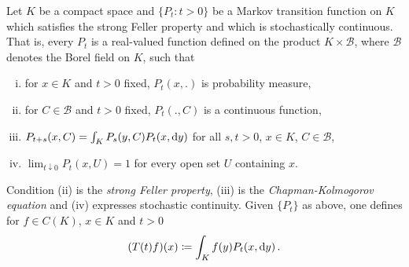 \begin{example}\label{ex:b4-2.6}
	Let $K$ be a compact space and $\{P_t \colon t > 0\}$ be a
	Markov transition function on $K$ which satisfies the strong Feller
	property and which is stochastically continuous.
	That is, every
	$P_t$ is a real-valued function defined on the product $K \times \mathcal{B}$, where $\mathcal{B}$
	denotes the Borel field on $K$, such that
	\begin{enumerate}[(i)]
		\item 
		for $x \in K$ and $t > 0$ fixed, $P_t(x,.)$ is probability measure,
	
		\item 
		for $C \in \mathcal{B}$ and $t > 0$ fixed, $P_t(.,C)$ is a continuous function,
	
		\item 
		$P_{t+s}(x,C) = \int_K P_s(y,C)P_t(x,\mathop{}\!\mathrm{d}{y})$ for all $s,t > 0$, $x \in K$, $C \in \mathcal{B}$,
	
		\item 
		$\lim_{t\downarrow0} P_t(x,U) = 1$ for every open set $U$ containing $x$.
	\end{enumerate}
	Condition (ii) is the \emph{strong Feller property}, (iii) is the \emph{Chapman-Kolmogorov equation} and (iv) expresses stochastic continuity.
	Given $\{P_t\}$ as above, one defines for $f \in C(K)$, $x \in K$ and $t > 0$
	\begin{equation}\label{eq:b4-2.4}
		(T(t)f)(x)  \coloneq  \int_K f(y)P_t(x,\mathop{}\!\mathrm{d}{y})\,.
	\end{equation}
	

\end{example}
